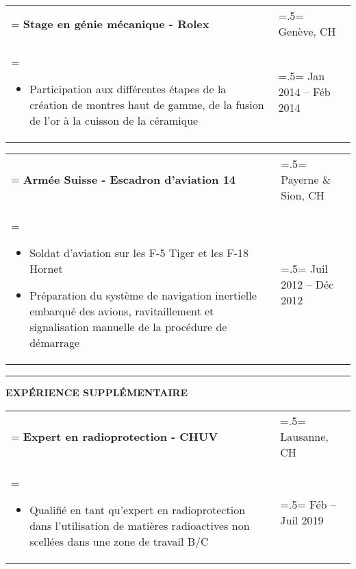 \documentclass[letterpaper, 11pt]{article}
\begin{document}
\begin{tabularx}{1.0\textwidth} { 
   >{\raggedright\arraybackslash\hsize=1.5\hsize\linewidth=\hsize}X 
   >{\raggedleft\arraybackslash\hsize=.5\hsize\linewidth=\hsize}X }
\normalsize
\bf{
Stage en génie mécanique - Rolex} & Genève, CH\\
\normalfont \begin{itemize}[leftmargin=*,noitemsep,topsep=0pt]
\item Participation aux différentes étapes de la création de montres haut de gamme, de la fusion de l'or à la cuisson de la céramique
\end{itemize} & Jan 2014 --  Féb 2014
\end{tabularx}

\begin{tabularx}{1.0\textwidth} { 
   >{\raggedright\arraybackslash\hsize=1.5\hsize\linewidth=\hsize}X 
   >{\raggedleft\arraybackslash\hsize=.5\hsize\linewidth=\hsize}X }
\normalsize
\bf{Armée Suisse - 
Escadron d'aviation 14} & Payerne \& Sion, CH\\
\normalfont \begin{itemize}[leftmargin=*,noitemsep,topsep=0pt]
\item Soldat d'aviation sur les F-5 Tiger et les F-18 Hornet
\item Préparation du système de navigation inertielle embarqué des avions, ravitaillement et signalisation manuelle de la procédure de démarrage
\end{itemize} & Juil 2012 -- Déc 2012
\end{tabularx}

\begin{center}
\noindent\rule{0.75\textwidth}{1pt}
\end{center}

\begin{center}
\large\bf{EXPÉRIENCE SUPPLÉMENTAIRE}
\end{center}

\begin{tabularx}{1.0\textwidth} { 
   >{\raggedright\arraybackslash\hsize=1.5\hsize\linewidth=\hsize}X 
   >{\raggedleft\arraybackslash\hsize=.5\hsize\linewidth=\hsize}X }
\normalsize
\bf{Expert en radioprotection - CHUV} & Lausanne, CH\\
\normalfont \begin{itemize}[leftmargin=*,noitemsep,topsep=0pt]
\item Qualifié en tant qu'expert en radioprotection dans l'utilisation de matières radioactives non scellées dans une zone de travail B/C
\end{itemize} & Féb -- Juil 2019
\end{tabularx}
\end{document}
